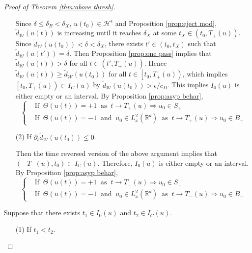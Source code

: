 \documentclass[reqno, 11pt]{amsart}
\numberwithin{equation}{section}
\newcommand{\R}{\mathbb{R}}
\theoremstyle{plain}
\theoremstyle{definition}
\numberwithin{equation}{section}
\numberwithin{theorem}{section}
\numberwithin{equation}{section}
\numberwithin{equation}{section}
\numberwithin{theorem}{section}
\begin{document}
\begin{proof}[Proof of Theorem \ref{thm:above thresh}]
\begin{enumerate}
			Since $\delta\leq\delta_{B}<\delta_{X}$, $u(t_0)\in \mathcal{H}^{\epsilon}$ and Proposition \ref{prop:eject mod}, $\widetilde{d}_{\mathcal{W}}\left(u(t)\right)$ is increasing until it reaches $\delta_{X}$ at some $t_X \in \left(t_0,T_+(u)\right)$. Since $\widetilde{d}_{\mathcal{W}}\left(u(t_0)\right)<\delta<\delta_X$, there exists $t'\in \left(t_0,t_X \right)$ such that $\widetilde{d}_{\mathcal{W}}\left(u(t')\right)=\delta$. Then Proposition \ref{prop:one pass} implies that $\widetilde{d}_{\mathcal{W}}\left(u(t)\right)>\delta$ for all $t\in \left(t',T_+(u) \right)$. Hence $\widetilde{d}_{\mathcal{W}}\left(u(t)\right)\geq \widetilde{d}_{\mathcal{W}}\left(u(t_0)\right)$ for all $t\in \left[t_0,T_+(u)\right)$, which implies $\left[t_0,T_+(u)\right)\subset I_C(u)$ by $\widetilde{d}_{\mathcal{W}}\left(u(t_0)\right)> \epsilon/c_D$. This implies $I_0(u)$ is either empty or an interval. By Proposition \ref{prop:asyp behar}, 
			\begin{equation*}
			\left\{\begin{aligned}
			&\text{If}\;\;\Theta(u(t))=+1\;\;\text{as}\;\;t\rightarrow T_+(u)\Longrightarrow u_0\in S_+\\
			&\text{If}\;\;\Theta(u(t))=-1\;\;\text{and}\;\;u_0\in L_x^2(\R^d)\;\;\text{as}\;\;t\rightarrow T_+(u)\Longrightarrow u_0\in B_+
			\end{aligned}\right.
			\end{equation*}	
			
			\item[(2)] If $\partial_{t}\widetilde{d}_{\mathcal{W}}\left(u(t_0)\right)\leq 0$.
			
			Then the time reversed version of the above argument implies that $\left(-T_-(u),t_0 \right)\subset I_C(u)$. Therefore, $I_0(u)$ is either empty or an interval. By Proposition \ref{prop:asyp behar}, 
			\begin{equation*}
			\left\{\begin{aligned}
			&\text{If}\;\;\Theta(u(t))=+1\;\;\text{as}\;\;t\rightarrow T_-(u)\Longrightarrow u_0\in S_-\\
			&\text{If}\;\;\Theta(u(t))=-1\;\;\text{and}\;\;u_0\in L_x^2(\R^d)\;\;\text{as}\;\;t\rightarrow T_-(u)\Longrightarrow u_0\in B_-
			\end{aligned}\right.
			\end{equation*}	
		\end{enumerate}	
		
		 Suppose that there exists $t_1\in I_0(u)$ and $t_2\in I_C(u)$. 
		\begin{enumerate}
			\item[(1)] If $t_1 <t_2$.
			

\end{enumerate}
\end{proof}
\end{document}
